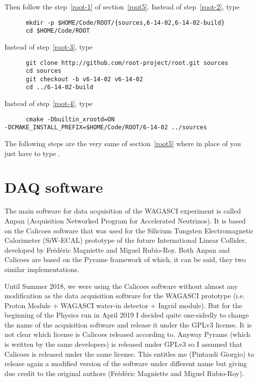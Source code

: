Then follow the step~\ref{root-1} of section~\ref{root5}. Instead of step~\ref{root-2}, type
\begin{lstlisting}
      mkdir -p $HOME/Code/ROOT/{sources,6-14-02,6-14-02-build}
      cd $HOME/Code/ROOT
\end{lstlisting}
Instead of step~\ref{root-3}, type
\begin{lstlisting}
      git clone http://github.com/root-project/root.git sources
      cd sources
      git checkout -b v6-14-02 v6-14-02
      cd ../6-14-02-build
\end{lstlisting}
Instead of step~\ref{root-4}, type
\begin{lstlisting}
      cmake -Dbuiltin_xrootd=ON
-DCMAKE_INSTALL_PREFIX=$HOME/Code/ROOT/6-14-02 ../sources
\end{lstlisting}

The following steps are the very same of section~\ref{root5} where in
place of  you just have to type
.

\chapter{DAQ software}
The main software for data acquisition of the WAGASCI experiment is
called Anpan (Acquisition Networked Program for Accelerated
Neutrinos). It is based on the Calicoes software that was used for the
Silicium Tungsten Electromagnetic Calorimeter (SiW-ECAL) prototype of
the future International Linear Collider, developed by Frédéric
Magniette and Miguel Rubio-Roy. Both Anpan and Calicoes are based on
the Pyrame framework of which, it can be said, they two similar
implementations.

Until Summer 2018, we were using the Calicoes software without almost
any modification as the data acquisition software for the WAGASCI
prototype (i.e. Proton Module + WAGASCI water-in detector + Ingrid
module). But for the beginning of the Physics run in April 2019 I
decided quite one-sidedly to change the name of the acquisition
software and release it under the GPLv3 license. It is not clear which
license is Calicoes released according to. Anyway Pyrame (which is
written by the same developers) is released under GPLv3 so I assumed
that Calicoes is released under the same license. This entitles me
(Pintaudi Giorgio) to release again a modified version of the software
under different name but giving due credit to the original authors
(Frédéric Magniette and Miguel Rubio-Roy).

